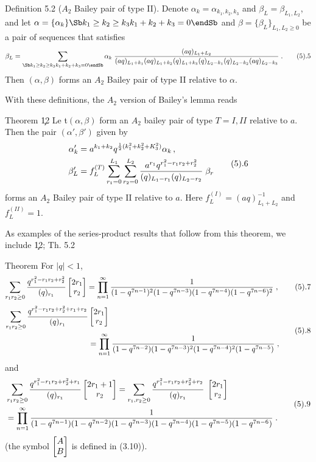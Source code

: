 {Definition 5.2} ($A_2$ Bailey pair of type II).  Denote $\alpha_k =
\alpha_{k_1,k_2,k_3}$ and $\beta_L = \beta_{L_1,L_2}$, and let
$\alpha = \{\alpha_k\} \Sb k_1 \geq k_2 \geq k_3 \\ k_1 + k_2 + k_3 = 0
\endSb$ and $\beta = \{\beta_L\}_{L_1,L_2 \geq 0}$ be a pair of
sequences that satisfies
$$
	\beta_L = \sum_{\Sb k_1 \geq k_2 \geq k_3 \\ k_1 + k_2 + k_3 = 0
	\endSb} \alpha_k \;\fr{(aq)_{L_1 + L_2}}{(aq)_{L_1 + k_1}
	(aq)_{L_1 + k_2}(q)_{L_1 + k_3}(q)_{L_2 - k_1}(q)_{L_2-k_2}
	(aq)_{L_2 - k_3}}\;.
\tag5.5
$$
Then $(\alpha,\beta)$ forms an $A_2$ Bailey pair of type II relative
to $\alpha$.
\enddefinition

With these definitions, the $A_2$ version of Bailey's lemma reads

\proclaim
{Theorem \c{12}} Le t$(\alpha,\beta)$ form an $A_2$ bailey pair of
type $T = I,II$ relative to $a$.  Then the pair $(\alpha',\beta')$
given by
$$
\aligned
	\alpha_k' & = a^{k_1 + k_2} q^{\fr12(k_1^2 + k_2^2 + K_3^2)}
	\alpha_k\,,   \\
	\beta_L' & = f_L^{(T)} \sum_{r_1 = 0}^{L_1} \sum_{r_2 = 0}^{L_2}
	\fr{a^{r_1} q^{r_1^2 - r_1 r_2 + r_2^2}}{(q)_{L_1 - r_1}
	(q)_{L_2 - r_2}}\;\beta_r
\endaligned
\tag5.6
$$
forms an $A_2$ Bailey pair of type II relative to $a$.  Here
$f_L^{(I)} = (aq)_{L_1 + L_2}^{-1}$ and $f_L^{(II)} = 1$.
\endproclaim

As examples of the series-product results that follow from this
theorem, we include \c{12; Th. 5.2}

\proclaim
{Theorem}  For $|q| < 1$,
$$
	\sum_{r_1 r_2 \geq 0} \fr{q^{r_1^2 - r_1 r_2 + r_2^2}}
	{(q)_{r_1}} \bmatrix 2r_1 \\ r_2 \endbmatrix =
	\prod_{n=1}^{\infty} \fr1{(1 - q^{7n-1})^2(1 - q^{7n-3})
	(1 - q^{7n-4})(1 - q^{7n-6})^2}\;,
\tag5.7
$$
$$
\aligned
	\sum_{r_1 r_2 \geq 0} \fr{q^{r_1^2 - r_1 r_2 + r_2^2+r_1+r_2}}
	{(q)_{r_1}} & \bmatrix 2r_1 \\ r_2 \endbmatrix \\
	& = \prod_{n=1}^{\infty} \fr1{(1 - q^{7n-2})(1 - q^{7n-3})^2
	(1 - q^{7n-4})^2(1 - q^{7n-5})}\;,
\endaligned
\tag5.8
$$
and
$$
\aligned
	& \sum_{r_1 r_2 \geq 0} \fr{q^{r_1^2 - r_1 r_2 + r_2^2+r_1}}
	{(q)_{r_1}} \bmatrix 2r_1 + 1 \\ r_2 \endbmatrix 
	= \sum_{r_1,r_2 \geq 0} \fr{q^{r_1^2-r_1 r_2 + r_2^2 + r_2}}
	{(q)_{r_1}}\;\bmatrix 2r_1 \\ r_2 \endbmatrix \\
	& = \prod_{n=1}^{\infty} \fr1{(1 - q^{7n-1})(1 - q^{7n-2})(1 - 
	q^{7n-3})(1 - q^{7n-4})(1 - q^{7n-5})(1 - q^{7n-6})}\;.
\endaligned
\tag5.9
$$
(the symbol $\bmatrix A \\ B\endbmatrix$ is defined in (3.10)).
\endproclaim

